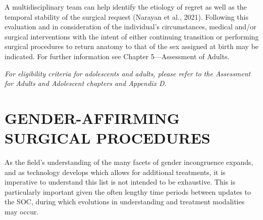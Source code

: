 \documentclass[
]{book}
\begin{document}
A multidisciplinary team can help identify the
etiology of regret as well as the temporal stability
of the surgical request (Narayan et al., 2021).
Following this evaluation and in consideration of
the individual's circumstances, medical and/or surgical interventions with the intent of either continuing transition or performing surgical procedures to
return anatomy to that of the sex assigned at birth
may be indicated. For further information see
Chapter 5---Assessment of Adults.

\emph{For eligibility criteria for adolescents and
adults, please refer to the Assessment for Adults
and Adolescent chapters and Appendix D.}

\hypertarget{gender-affirming-surgical-procedures}{%
\section*{GENDER-AFFIRMING SURGICAL PROCEDURES}\label{gender-affirming-surgical-procedures}}

As the field's understanding of the many facets
of gender incongruence expands, and as technology develops which allows for additional treatments, it is imperative to understand this list is
not intended to be exhaustive. This is particularly
important given the often lengthy time periods
between updates to the SOC, during which evolutions in understanding and treatment modalities
may occur.
\end{document}
